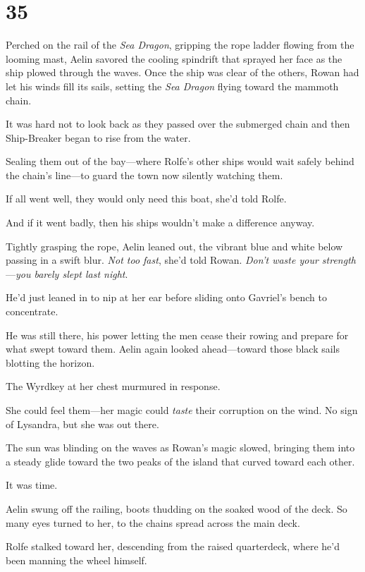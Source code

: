 
\chapter{35}

Perched on the rail of the \emph{Sea Dragon}, gripping the rope ladder flowing from the looming mast, Aelin savored the cooling spindrift that sprayed her face as the ship plowed through the waves.
Once the ship was clear of the others, Rowan had let his winds fill its sails, setting the \emph{Sea Dragon} flying toward the mammoth chain.

It was hard not to look back as they passed over the submerged chain  and then Ship-Breaker began to rise from the water.

Sealing them out of the bay---where Rolfe's other ships would wait safely behind the chain's line---to guard the town now silently watching them.

If all went well, they would only need this boat, she'd told Rolfe.

And if it went badly, then his ships wouldn't make a difference anyway.

Tightly grasping the rope, Aelin leaned out, the vibrant blue and white below passing in a swift blur.
\emph{Not too fast}, she'd told Rowan.
\emph{Don't waste your strength} ---\emph{you barely slept last night}.

He'd just leaned in to nip at her ear before sliding onto Gavriel's bench to concentrate.

He was still there, his power letting the men cease their rowing and prepare for what swept toward them.
Aelin again looked ahead---toward those black sails blotting the horizon.

The Wyrdkey at her chest murmured in response.

She could feel them---her magic could \emph{taste} their corruption on the wind.
No sign of Lysandra, but she was out there.

The sun was blinding on the waves as Rowan's magic slowed, bringing them into a steady glide toward the two peaks of the island that curved toward each other.

It was time.

Aelin swung off the railing, boots thudding on the soaked wood of the deck.
So many eyes turned to her, to the chains spread across the main deck.

Rolfe stalked toward her, descending from the raised quarterdeck, where he'd been manning the wheel himself.

